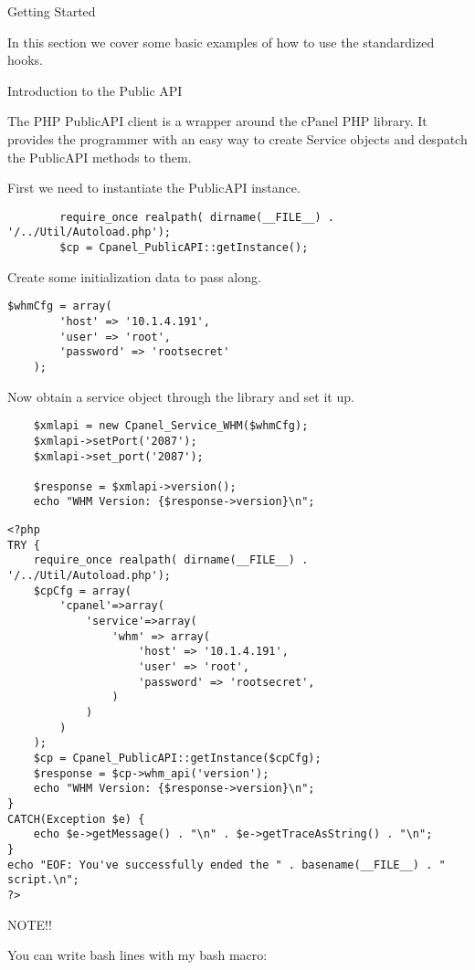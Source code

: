 \begin{section}{Getting Started}
  
  In this section we cover some basic examples of how to use the standardized hooks.
  
  \begin{subsection}{Introduction to the Public API}
    
    The PHP PublicAPI client is a wrapper around the cPanel PHP library. It
    provides the programmer with an easy way to create Service objects and
    despatch the PublicAPI methods to them.
    
    First we need to instantiate the \cPanel PublicAPI instance.
      
\begin{verbatim}
        require_once realpath( dirname(__FILE__) . '/../Util/Autoload.php');
        $cp = Cpanel_PublicAPI::getInstance();
\end{verbatim}

Create some initialization data to pass along.

\begin{verbatim}
$whmCfg = array(
        'host' => '10.1.4.191',
        'user' => 'root',
        'password' => 'rootsecret'
    );        
\end{verbatim}

Now obtain a service object through the \cPanel library and set it up.

\begin{verbatim}
    $xmlapi = new Cpanel_Service_WHM($whmCfg);
    $xmlapi->setPort('2087');
    $xmlapi->set_port('2087');
    
    $response = $xmlapi->version();
    echo "WHM Version: {$response->version}\n";
\end{verbatim}

\newpage

\begin{verbatim}
<?php
TRY {
    require_once realpath( dirname(__FILE__) . '/../Util/Autoload.php');
    $cpCfg = array(
        'cpanel'=>array(
            'service'=>array(
                'whm' => array(
                    'host' => '10.1.4.191',
                    'user' => 'root',
                    'password' => 'rootsecret',
                )
            )
        )
    );
    $cp = Cpanel_PublicAPI::getInstance($cpCfg);
    $response = $cp->whm_api('version');
    echo "WHM Version: {$response->version}\n";
}
CATCH(Exception $e) {
    echo $e->getMessage() . "\n" . $e->getTraceAsString() . "\n";
}
echo "EOF: You've successfully ended the " . basename(__FILE__) . " script.\n";
?>
\end{verbatim}
  \end{subsection}

  \newpage

\begin{subsection}{NOTE!!}

You can write bash lines with my bash macro:



\end{subsection}
\end{section}
